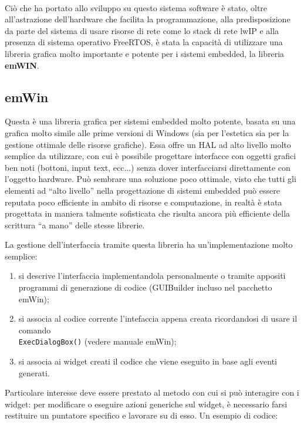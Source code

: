 \documentclass[a4paper,titlepage]{book}
\begin{document}
~

Ciò che ha portato allo sviluppo su questo sistema software è stato, oltre all'astrazione dell'hardware che facilita la programmazione, alla predisposizione da parte del sistema di usare risorse di rete come lo stack di rete lwIP e alla presenza di sistema operativo FreeRTOS, è stata la capacità di utilizzare una libreria grafica molto importante e potente per i sistemi embedded, la libreria \textbf{emWIN}.

\subsection{emWin}

Questa è una libreria grafica per sistemi embedded molto potente, basata su una grafica molto simile alle prime versioni di Windows (sia per l'estetica sia per la gestione ottimale delle risorse grafiche). Essa offre un HAL ad alto livello molto semplice da utilizzare, con cui è possibile progettare interfacce con oggetti grafici ben noti (bottoni, input text, ecc...) senza dover interfacciarsi direttamente con l'oggetto hardware. Può sembrare una soluzione poco ottimale, visto che tutti gli elementi ad ``alto livello'' nella progettazione di sistemi embedded può essere reputata poco efficiente in ambito di risorse e computazione, in realtà è stata progettata in maniera talmente sofisticata che risulta ancora più efficiente della scrittura ``a mano'' delle stesse librerie.

La gestione dell'interfaccia tramite questa libreria ha un'implementazione molto semplice:

\begin{enumerate}[noitemsep,topsep=18pt,parsep=10pt,partopsep=0pt]
\item si descrive l'interfaccia implementandola personalmente o tramite appositi programmi di generazione di codice (GUIBuilder incluso nel pacchetto emWin);
\item si associa al codice corrente l'intefaccia appena creata ricordandosi di usare il comando \\\lstinline!ExecDialogBox()! (vedere manuale emWin);
\item si associa ai widget creati il codice che viene eseguito in base agli eventi generati.

\end{enumerate}

Particolare interesse deve essere prestato al metodo con cui si può interagire con i widget: per modificare o eseguire azioni generiche sul widget, è necessario farsi restituire un puntatore specifico e lavorare su di esso. Un esempio di codice:
\end{document}
